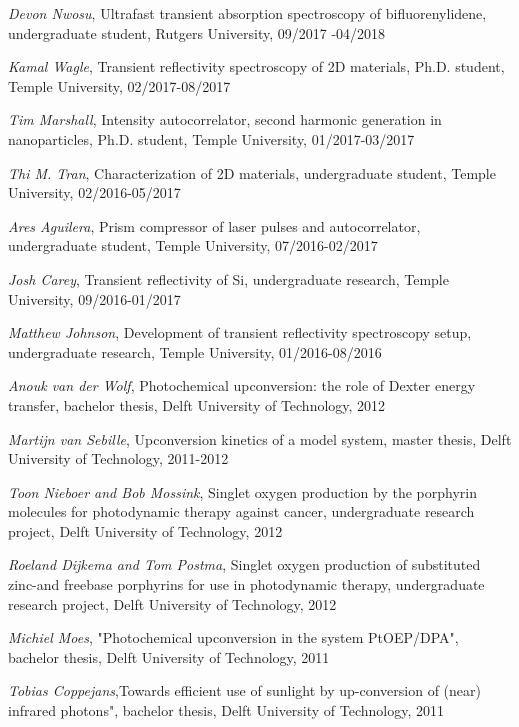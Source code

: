 \documentclass[11pt,letterpaper,sans]{moderncv} %
\begin{document}
\begin{etaremune}
	\item \emph{Devon Nwosu}, Ultrafast transient absorption spectroscopy of
	      bifluorenylidene,
	      undergraduate student, Rutgers University, 09/2017 -04/2018
	\item \emph{Kamal Wagle}, Transient reflectivity spectroscopy of 2D materials, 
	      Ph.D. student, Temple University, 02/2017-08/2017
	\item \emph{Tim Marshall}, Intensity autocorrelator, 
	      second harmonic generation in nanoparticles, Ph.D. student, Temple University,
	      01/2017-03/2017 
	\item \emph{Thi M. Tran}, Characterization of 2D materials, undergraduate student, 
	      Temple University, 02/2016-05/2017
	\item \emph{Ares Aguilera}, Prism compressor of laser pulses and autocorrelator,
	      undergraduate student, Temple University, 07/2016-02/2017
	\item \emph{Josh Carey}, Transient reflectivity of Si, undergraduate research, 
	      Temple University, 09/2016-01/2017
	\item \emph{Matthew Johnson}, Development of transient reflectivity spectroscopy setup,   
	      undergraduate research, Temple University, 01/2016-08/2016
	\item \emph{Anouk van der Wolf}, Photochemical upconversion: 
	      the role of Dexter energy transfer, bachelor thesis, Delft University of 	
	      Technology, 2012
	\item \emph{Martijn van Sebille}, Upconversion kinetics of a model system, 
	      master thesis, Delft University of Technology, 2011-2012
	\item \emph{Toon Nieboer and Bob Mossink}, Singlet oxygen production by the 
	      porphyrin molecules for photodynamic therapy against cancer,
	      undergraduate research project, Delft University of Technology, 2012
	\item \emph{Roeland Dijkema and Tom Postma}, Singlet oxygen production of 
	      substituted zinc-and freebase porphyrins for use in photodynamic therapy,
	      undergraduate research project, Delft University of Technology, 2012
	\item \emph{Michiel Moes}, "Photochemical upconversion in the system PtOEP/DPA", 
	      bachelor thesis, Delft University of Technology, 2011
	\item \emph{Tobias Coppejans},Towards efficient use of sunlight by up-conversion 
	      of (near) infrared photons", bachelor thesis, Delft University of Technology, 2011
\end{etaremune}
\end{document}
